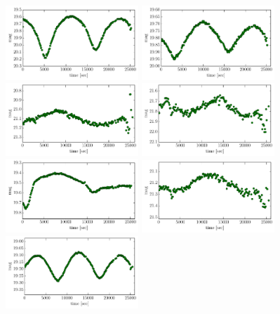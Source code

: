 \documentclass[iop, apj]{emulateapj}
\newcommand{\?}{\stackrel{?}{=}}
\begin{document}
\begin{figure}[t]
\includegraphics[width=5cm,clip,angle=90]{pic/binary/cand_7.pdf}
\includegraphics[width=5cm,clip,angle=90]{pic/binary/cand_8.pdf}
\includegraphics[width=5cm,clip,angle=90]{pic/binary/cand_9.pdf}
\includegraphics[width=5cm,clip,angle=90]{pic/binary/cand_10.pdf}
\includegraphics[width=5cm,clip,angle=90]{pic/binary/cand_11.pdf}
\includegraphics[width=5cm,clip,angle=90]{pic/binary/cand_12.pdf}
\includegraphics[width=5cm,clip,angle=90]{pic/binary/cand_13.pdf}

\end{figure}
\end{document}
